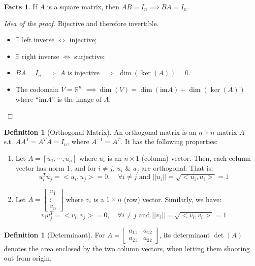 \documentclass[12pt]{article}
\newcommand{\R}{{\mathbb R}}
\theoremstyle{definition}
\newtheorem{definition}[theorem]{Definition}
\newtheorem{fact}[theorem]{Facts}
\theoremstyle{plain}
\begin{document}
\begin{fact}
    If $A$ is a square matrix, then $A B = I_n \implies BA = I_n$.
    \begin{proof}
        [Idea of the proof]
        Bijective and therefore invertible.
        \begin{itemize}
            \item $\exists$ left inverse $\iff$ injective;
            \item $\exists$ right inverse $\iff$ surjective;
            \item $BA =  I_n$ $\implies $ $A$ is injective $\implies$
                $\dim(\ker(A)) = 0$.
            \item The codomain $ V = \R^n$ $\implies \dim(V) = \dim(\text{im} A) +
                \dim (\ker (A))$ where ``$\text{im} A$'' is the image of $A$.
        \end{itemize}
    \end{proof}
\end{fact}

\begin{definition}
    [Orthogonal Matrix]
    An orthogonal matrix is an $n \times n$ matrix $A$ s.t. $A A^T = A^T A =
    I_n$, where $A^{-1} = A^T$. It has the following properties:
    \begin{enumerate}[(1)]
        \item Let $A = [u_1, \cdots, u_n]$ where $u_i$ is an $n\times 1$
            (column) vector.
            Then, each column vector has norm $1$, and for $i \not = j$, $u_i$
            \& $u_j$ are orthogonal.
            That is:
            \[
                u_i^T u_j = <u_i, u_j> = 0, \quad \forall i \not = j \text{ and
                } ||u_i|| = \sqrt{<u_i,u_i>} = 1
            \]
        \item Let $A = \begin{bmatrix}
            v_1 \\ \vdots \\ v_n
        \end{bmatrix}$
        where $v_i$ is a $1 \times n$ (row) vector. Similarly, we have:
            \[
                v_i v_j^T = <v_i, v_j> = 0, \quad \forall i \not = j \text{ and
                } ||v_i|| = \sqrt{<v_i,v_i>} = 1
            \]
    \end{enumerate}
\end{definition}

\newpage
\begin{definition}
    [Determinant]
    For $A= \begin{bmatrix}
        a_{11} & a_{12} \\ a_{21} & a_{22}
    \end{bmatrix}$, its determinant $\det(A)$ denotes the area enclosed by the
    two column vectors, when letting them shooting out from origin.
\end{definition}
\end{document}
